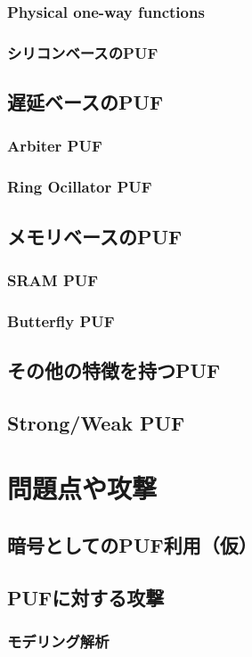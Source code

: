 \documentclass[survey]{ieicej}%
\begin{document}
\subsubsection{Physical one-way functions}
\subsubsection{シリコンベースのPUF}
\subsection{遅延ベースのPUF}
\subsubsection{Arbiter PUF}
\subsubsection{Ring Ocillator PUF}
\subsection{メモリベースのPUF}
\subsubsection{SRAM PUF}
\subsubsection{Butterfly PUF}
\subsection{その他の特徴を持つPUF}
\subsection{Strong/Weak PUF}

\section{問題点や攻撃}
\subsection{暗号としてのPUF利用（仮）}

\subsection{PUFに対する攻撃}
\subsubsection{モデリング解析}
\end{document}
